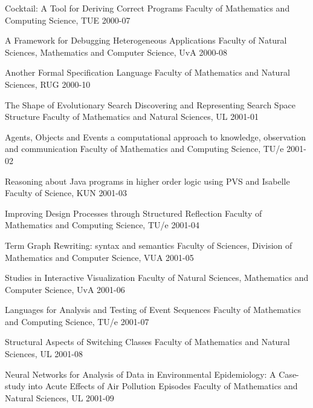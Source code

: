 \begin{multicols}{2}
         {Cocktail: A Tool for Deriving Correct Programs}
         {Faculty of Mathematics and Computing Science, TUE}
         {2000-07}

         {A Framework for Debugging Heterogeneous Applications}
         {Faculty of Natural Sciences, Mathematics and Computer
Science, UvA}
         {2000-08}

         {Another Formal Specification Language}
         {Faculty of Mathematics and Natural Sciences, RUG}
         {2000-10}

         {The Shape of Evolutionary Search Discovering and
Representing Search Space Structure}
         {Faculty of Mathematics and Natural Sciences, UL}
         {2001-01}

         {Agents, Objects and Events
          a computational approach to knowledge, observation and
             communication}
         {Faculty of Mathematics and Computing Science, TU/e}
         {2001-02}

         {Reasoning about Java programs in higher order logic using PVS
          and Isabelle}
         {Faculty of Science, KUN}
         {2001-03}

         {Improving Design Processes through Structured Reflection}
         {Faculty of Mathematics and Computing Science, TU/e}
         {2001-04}

         {Term Graph Rewriting: syntax and semantics}
         {Faculty of Sciences, Division of Mathematics and Computer Science,
        VUA}
         {2001-05}

         {Studies in Interactive Visualization}
         {Faculty of Natural Sciences, Mathematics and Computer
          Science, UvA}
         {2001-06}

         {Languages for Analysis and Testing of Event Sequences}
         {Faculty of Mathematics and Computing Science, TU/e}
         {2001-07}

         {Structural Aspects of Switching Classes}
         {Faculty of Mathematics and Natural Sciences, UL}
         {2001-08}

         {Neural Networks for Analysis of Data in Environmental
Epidemiology: A Case-study into Acute Effects of Air Pollution Episodes}
         {Faculty of Mathematics and Natural Sciences, UL}
         {2001-09}


\end{multicols}
